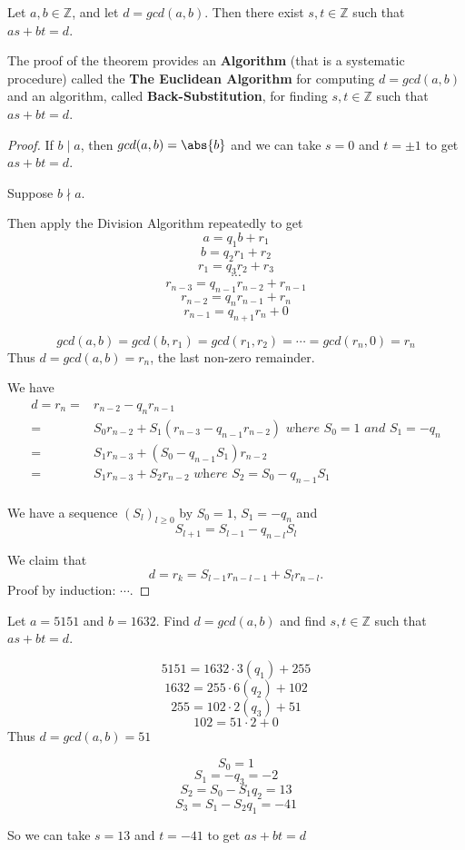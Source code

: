 
\begin{thm}
Let $a,b\in \mathbb{Z}$, and let $d = gcd(a,b)$. Then there exist $s,t\in\mathbb{Z}$ such that $as+bt = d$.
\end{thm}

The proof of the theorem provides an \textbf{Algorithm} (that is a systematic procedure) called the \textbf{The Euclidean Algorithm} for computing $d = gcd(a,b)$ and an algorithm, called \textbf{Back-Substitution}, for finding $s,t\in\mathbb{Z}$ such that $as+bt = d$.

\begin{proof}
If $b\mid a$, then $gcd(a,b) = \abs{b}$ and we can take $s=0$ and $t = \pm 1$ to get $as+bt = d$.

Suppose $b\nmid a$.


Then apply the Division Algorithm repeatedly to get 
\[a = q_1b+r_1\]
\[b = q_2r_1 + r_2\]
\[r_1 = q_3 r_2 + r_3\]
\[\cdots\]
\[r_{n-3} = q_{n-1}r_{n-2} + r_{n-1}\]
\[r_{n-2} = q_{n}r_{n-1} + r_n\]
\[r_{n-1} = q_{n+1}r_n+0\]

\[gcd(a,b) = gcd(b,r_1) = gcd(r_1,r_2) = \cdots = gcd(r_n, 0) = r_n\]
Thus $d = gcd(a,b) = r_n$, the last non-zero remainder.

We have \begin{align*}
    d = r_n = & r_{n-2} - q_nr_{n-1} \\
    = & S_0r_{n-2} + S_1 (r_{n-3} - q_{n-1}r_{n-2})  \textit{ where } S_0 = 1 \textit{ and } S_1 = -q_n\\
    = & S_1 r_{n-3} + (S_0 - q_{n-1}S_1)r_{n-2} \\
    = & S_1 r_{n-3} + S_2 r_{n-2}  \textit{ where } S_2 = S_0 - q_{n-1}S_1 \\
\end{align*} 

We have a sequence $(S_l)_{l\geq 0}$ by $S_0 = 1$, $S_1 = -q_n$ and \[S_{l+1} = S_{l-1} - q_{n-l}S_l\]

We claim that \[d= r_k = S_{l-1}r_{n-l-1} + S_lr_{n-l}.\] 
Proof by induction: $\cdots.$
\end{proof}



\begin{exmp}
Let $a = 5151$ and $b = 1632$. Find $d = gcd(a,b)$ and find $s,t\in\mathbb{Z}$ such that $as+bt = d$.
\end{exmp}

\begin{solution}
\[5151 = 1632 \cdot 3(q_1) + 255\]
\[1632 = 255 \cdot 6(q_2) + 102\]
\[255 = 102 \cdot 2(q_3) + 51\]
\[102 = 51 \cdot 2 + 0\]
Thus $d = gcd(a,b) = 51$

\[S_0 = 1\]
\[S_1 = -q_3 = -2\]
\[S_2 = S_0 - S_1q_2 = 13\]
\[S_3 = S_1 - S_2q_1 = -41\]

So we can take $s= 13$ and $t = -41$ to get $as+bt = d$
\end{solution}



